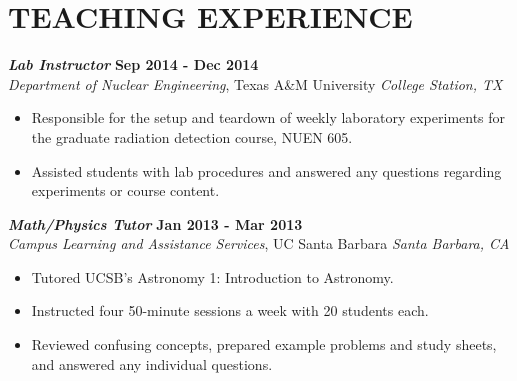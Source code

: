 \section{\small{TEACHING EXPERIENCE}}

{\sl\bf Lab Instructor} \hfill {\bf Sep 2014 - Dec 2014} \\
{\sl Department of Nuclear Engineering}, Texas A\&M University \hfill {\sl College Station, TX}
\vspace{2pt}
\begin{itemize}[leftmargin=4ex] \itemsep -2pt
\item Responsible for the setup and teardown of weekly laboratory experiments for the graduate radiation detection course, NUEN 605.
\item Assisted students with lab procedures and answered any questions regarding experiments or course content.
\end{itemize} 

{\sl\bf Math/Physics Tutor} \hfill {\bf Jan 2013 - Mar 2013} \\
{\sl Campus Learning and Assistance Services}, UC Santa Barbara \hfill {\sl Santa Barbara, CA} %
\vspace{2pt}
\begin{itemize}[leftmargin=4ex] \itemsep -2pt
\item Tutored UCSB's Astronomy 1: Introduction to Astronomy. 		
\item Instructed four 50-minute sessions a week with 20 students each.
\item Reviewed confusing concepts, prepared example problems and study sheets, and answered any individual questions.
\end{itemize} 